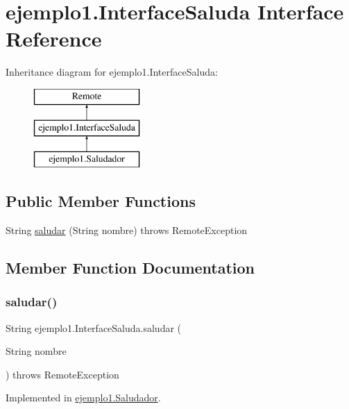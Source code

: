 \hypertarget{interfaceejemplo1_1_1_interface_saluda}{}\section{ejemplo1.\+Interface\+Saluda Interface Reference}
\label{interfaceejemplo1_1_1_interface_saluda}
Inheritance diagram for ejemplo1.\+Interface\+Saluda\+:\begin{figure}[H]
\begin{center}
\leavevmode
\includegraphics[height=3.000000cm]{interfaceejemplo1_1_1_interface_saluda}
\end{center}
\end{figure}
\subsection*{Public Member Functions}
\begin{DoxyCompactItemize}
\item 
String \mbox{\hyperlink{interfaceejemplo1_1_1_interface_saluda_a78bdbef5411444fbb2525f2862a29eff}{saludar}} (String nombre)  throws Remote\+Exception
\end{DoxyCompactItemize}


\subsection{Member Function Documentation}
\mbox{\label{interfaceejemplo1_1_1_interface_saluda_a78bdbef5411444fbb2525f2862a29eff}} 
\subsubsection{\texorpdfstring{saludar()}{saludar()}}
{\footnotesize\ttfamily String ejemplo1.\+Interface\+Saluda.\+saludar (\begin{DoxyParamCaption}\item[{String}]{nombre }\end{DoxyParamCaption}) throws Remote\+Exception}



Implemented in \mbox{\hyperlink{classejemplo1_1_1_saludador_accec00f9fe8215cabc7a9a8c8016c538}{ejemplo1.\+Saludador}}.

